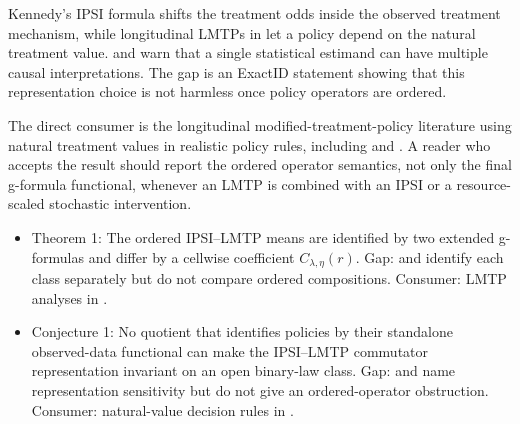 \documentclass[11pt]{article}
\theoremstyle{definition}
\theoremstyle{plain}
\theoremstyle{remark}
\begin{document}
Kennedy's IPSI formula \citep[Sec.~2, Eq.~1]{Kennedy2019JASA} shifts the treatment odds inside the observed treatment mechanism, while longitudinal LMTPs in \citet[Sec.~2.1]{DiazWilliamsHoffmanSchenck2023JASA} let a policy depend on the natural treatment value. \citet[Sec.~2]{VanDerLaanLuedtkeDiaz2014EM} and \citet[Sec.~2.3]{WenMarcusYoung2023SMMR} warn that a single statistical estimand can have multiple causal interpretations. The gap is an ExactID statement showing that this representation choice is not harmless once policy operators are ordered.

The direct consumer is the longitudinal modified-treatment-policy literature using natural treatment values in realistic policy rules, including \citet{YoungHernanRobins2014EM} and \citet{StensrudLaurendeauSarvet2024Biometrika}. A reader who accepts the result should report the ordered operator semantics, not only the final g-formula functional, whenever an LMTP is combined with an IPSI or a resource-scaled stochastic intervention.

\begin{itemize}[leftmargin=*]
\item Theorem 1: The ordered IPSI--LMTP means are identified by two extended g-formulas and differ by a cellwise coefficient \(C_{\lambda,\eta}(r)\). Gap: \citet{Kennedy2019JASA} and \citet{DiazWilliamsHoffmanSchenck2023JASA} identify each class separately but do not compare ordered compositions. Consumer: LMTP analyses in \citet{HoffmanSalazarBarretoWilliamsRudolphDiaz2024Epidemiology}.
\item Conjecture 1: No quotient that identifies policies by their standalone observed-data functional can make the IPSI--LMTP commutator representation invariant on an open binary-law class. Gap: \citet{VanDerLaanLuedtkeDiaz2014EM} and \citet{WenMarcusYoung2023SMMR} name representation sensitivity but do not give an ordered-operator obstruction. Consumer: natural-value decision rules in \citet{StensrudLaurendeauSarvet2024Biometrika}.
\end{itemize}
\end{document}
